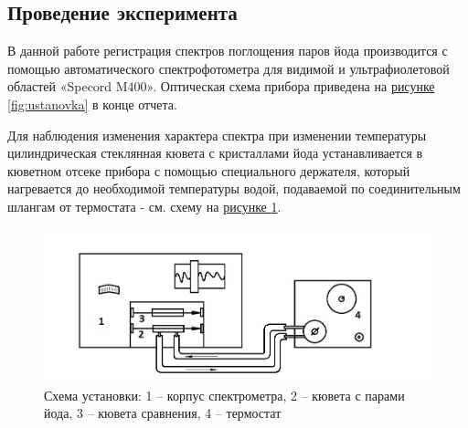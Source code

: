 \documentclass{article}
\begin{document}
\subsection{Проведение эксперимента}

В данной работе регистрация спектров поглощения паров йода производится с помощью автоматического спектрофотометра для видимой и ультрафиолетовой областей «Specord M400». Оптическая схема прибора приведена на \hyperref[fig:ustanovka]{рисунке \ref*{fig:ustanovka}} в конце отчета.


Для наблюдения изменения характера спектра при изменении температуры цилиндрическая стеклянная кювета с кристаллами йода устанавливается в кюветном отсеке прибора с помощью специального держателя, который нагревается до необходимой температуры водой, подаваемой по соединительным шлангам от термостата - см. схему на \hyperref[fig:ustanovka2]{рисунке \ref*{fig:ustanovka2}}.


\begin{figure}[h!]
    \centering
    \includegraphics[scale=0.3]{Screenshot 2024-02-12 at 10.12.27 AM.png}
    \caption{Схема установки: 1 – корпус спектрометра, 2 – кювета с парами йода, 3 – кювета сравнения, 4 – термостат}
    \label{fig:ustanovka2}
\end{figure}
\end{document}
